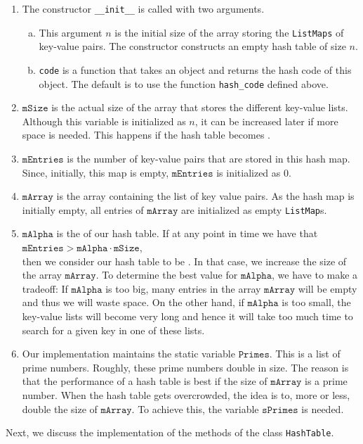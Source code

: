 \begin{enumerate}
\item The constructor \texttt{\_\_init\_\_} is called with two arguments.
      \begin{enumerate}[(a)]
      \item This argument $n$ is the initial size of the array storing the \texttt{ListMaps} of key-value
            pairs.  The constructor constructs an empty hash table of size $n$.
      \item \texttt{code} is a function that takes an object and returns the hash code of this object.
            The default is to use the function \texttt{hash\_code} defined above.
      \end{enumerate}
\item $\texttt{mSize}$ is the actual size of the array that stores the different key-value lists.
      Although this variable is initialized as $n$, it can be increased later if more space is needed.  This happens 
      if the hash table becomes .
\item $\texttt{mEntries}$ is the number of key-value pairs that are stored in this hash map.
      Since, initially, this map is empty, $\texttt{mEntries}$ is  initialized as $0$.
\item $\texttt{mArray}$ is the array containing the list of key value pairs.
      As the hash map is initially empty, all entries of $\texttt{mArray}$ are initialized as empty \texttt{ListMap}s.
\item $\texttt{mAlpha}$ is the  of our hash table.  If at any point in time we have that
      \\[0.2cm]
      \hspace*{1.3cm}
      $\texttt{mEntries} > \texttt{mAlpha} \cdot \texttt{mSize}$,
      \\[0.2cm]
      then we consider our hash table to be .  In that case, we increase the size
      of the array $\texttt{mArray}$.  To determine the best value for $\texttt{mAlpha}$, we have to
      make a tradeoff:  If $\texttt{mAlpha}$ is too big, many entries in the array $\texttt{mArray}$
      will be empty and thus we will waste space.  On the other hand, if $\texttt{mAlpha}$ is too
      small, the key-value lists will become very long and hence it will take too much time to
      search for a given key in one of these lists.
\item Our implementation maintains the static variable $\texttt{Primes}$.  This is a list of prime numbers.
      Roughly, these prime numbers double in size.   
      The reason is that the performance of a hash table is best if the size of $\texttt{mArray}$ is a
      prime number.  When the hash table gets overcrowded, the idea is to, more or less, double
      the size of $\texttt{mArray}$.  To achieve this, the variable $\texttt{sPrimes}$ is needed.
\end{enumerate}
Next, we discuss the implementation of the  methods of the class \texttt{HashTable}.

